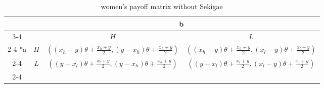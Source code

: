 \documentclass{article}
\begin{document}
	\begin{table}[h]
                \begin{center}
                \begingroup
                \renewcommand{\arraystretch}{1.8}
                \begin{tabular}{*{4}{c|}}
                  \multicolumn{2}{c}{} & \multicolumn{2}{c}{b}\\\cline{3-4}
                  \multicolumn{1}{c}{} &  & $H$  & $L$ \\\cline{2-4}
                  \multirow{2}*{a}  & $H$ & $((x_h - y)\theta + \frac{x_h+y}{2}, (y - x_h)\theta + \frac{x_h+y}{2})$ & $((x_h - y)\theta+\frac{x_h+y}{2}, (x_l - y)\theta + \frac{x_l+y}{2})$ \\\cline{2-4}
                  & $L$ & $((y-x_l)\theta + \frac{x_l+y}{2}, (y-x_h)\theta + \frac{x_h+y}{2})$ & $((y-x_l)\theta + \frac{x_l+y}{2}, (x_l - y)\theta + \frac{x_l+y}{2})$ \\\cline{2-4}
                \end{tabular}
                \endgroup
                \end{center}
                \caption{women's payoff matrix without Sekigae}
  	\end{table}
	
\end{document}
